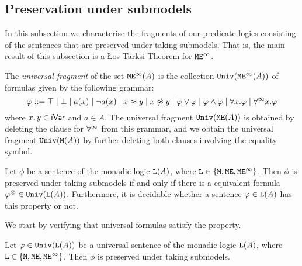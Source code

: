 
\subsection{Preservation under submodels}

In this subsection we characterise the fragments of our predicate logics 
consisting of the sentences that are preserved under taking submodels.
That is, the main result of this subsection is a {\L}os-Tarksi Theorem for
$\mathtt{M}\mathtt{E}^{\infty}$.

\begin{definition}
The \emph{universal fragment} of the set $\mathtt{M}\mathtt{E}^{\infty}(A)$ is the collection 
$\mathtt{Univ}(\mathtt{M}\mathtt{E}^{\infty}(A))$ of formulas given by the following grammar:
\[
\varphi \mathrel{::=}
\top \mid \bot 
\mid a(x)
\mid \neg a(x)
\mid x \approx y
\mid x \not\approx y
\mid \varphi \lor \varphi
\mid \varphi \land \varphi
\mid \forall x.\varphi
\mid \forall^\infty x.\varphi
\]
where $x,y\in \mathsf{iVar}$ and $a \in A$.
The universal fragment $\mathtt{Univ}(\mathtt{M}\mathtt{E}(A))$ is obtained by deleting the clause for
$\forall^\infty$ from this grammar, and we obtain the universal fragment $\mathtt{Univ}(\mathtt{M}(A))$ 
by further deleting both clauses involving the equality symbol.
\end{definition}

\begin{theorem}
\label{t:univ}
Let $\phi$ be a sentence of the monadic logic $\mathtt{L}(A)$, where $\mathtt{L} \in 
\{ \mathtt{M}, \mathtt{M}\mathtt{E}, \mathtt{M}\mathtt{E}^{\infty} \}$.
Then $\phi$ is preserved under taking submodels if and only if there is a 
equivalent formula $\varphi^{\otimes} \in \mathtt{Univ}(\mathtt{L}(A))$.
Furthermore, it is decidable whether a sentence $\varphi \in \mathtt{L}(A)$ has this 
property or not.
\end{theorem}

We start by verifying that universal formulas satisfy the property. 

\begin{proposition}
\label{p:univ1}
Let $\varphi \in \mathtt{Univ}(\mathtt{L}(A))$ be a universal sentence of the monadic logic $\mathtt{L}(A)$, where $\mathtt{L} \in 
\{ \mathtt{M}, \mathtt{M}\mathtt{E}, \mathtt{M}\mathtt{E}^{\infty} \}$. 
Then $\phi$ is preserved under taking submodels.
\end{proposition}

